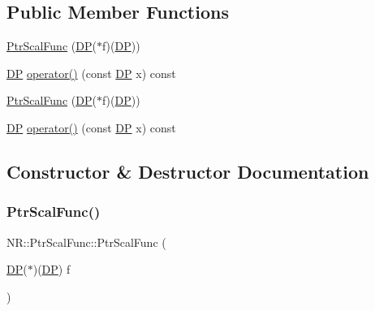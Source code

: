 \subsection*{Public Member Functions}
\begin{DoxyCompactItemize}
\item 
\mbox{\hyperlink{classNR_1_1PtrScalFunc_aa3e7954dd902a46c492bd39d4c21a71c}{Ptr\+Scal\+Func}} (\mbox{\hyperlink{namespaceNR_af6ff762dd605ff477b8e52387253a02a}{DP}}($\ast$f)(\mbox{\hyperlink{namespaceNR_af6ff762dd605ff477b8e52387253a02a}{DP}}))
\item 
\mbox{\hyperlink{namespaceNR_af6ff762dd605ff477b8e52387253a02a}{DP}} \mbox{\hyperlink{classNR_1_1PtrScalFunc_a661b2194b67e1e0e0de15389f0cea5f1}{operator()}} (const \mbox{\hyperlink{namespaceNR_af6ff762dd605ff477b8e52387253a02a}{DP}} x) const
\item 
\mbox{\hyperlink{classNR_1_1PtrScalFunc_aa3e7954dd902a46c492bd39d4c21a71c}{Ptr\+Scal\+Func}} (\mbox{\hyperlink{namespaceNR_af6ff762dd605ff477b8e52387253a02a}{DP}}($\ast$f)(\mbox{\hyperlink{namespaceNR_af6ff762dd605ff477b8e52387253a02a}{DP}}))
\item 
\mbox{\hyperlink{namespaceNR_af6ff762dd605ff477b8e52387253a02a}{DP}} \mbox{\hyperlink{classNR_1_1PtrScalFunc_a661b2194b67e1e0e0de15389f0cea5f1}{operator()}} (const \mbox{\hyperlink{namespaceNR_af6ff762dd605ff477b8e52387253a02a}{DP}} x) const
\end{DoxyCompactItemize}


\subsection{Constructor \& Destructor Documentation}
\mbox{\label{classNR_1_1PtrScalFunc_aa3e7954dd902a46c492bd39d4c21a71c}} 
\subsubsection{\texorpdfstring{PtrScalFunc()}{PtrScalFunc()}\hspace{0.1cm}{\footnotesize\ttfamily [1/2]}}
{\footnotesize\ttfamily N\+R\+::\+Ptr\+Scal\+Func\+::\+Ptr\+Scal\+Func (\begin{DoxyParamCaption}\item[{\mbox{\hyperlink{namespaceNR_af6ff762dd605ff477b8e52387253a02a}{DP}}($\ast$)(\mbox{\hyperlink{namespaceNR_af6ff762dd605ff477b8e52387253a02a}{DP}})}]{f }\end{DoxyParamCaption})\hspace{0.3cm}{\ttfamily [inline]}}


